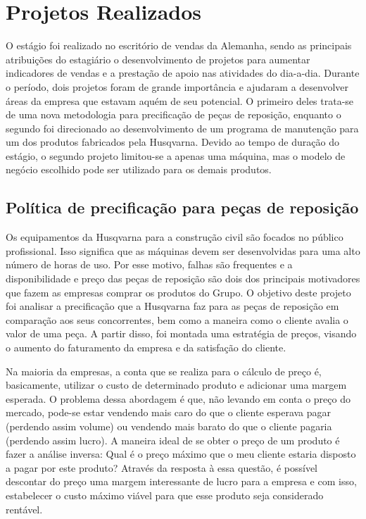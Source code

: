 \documentclass[12pt]{article}
\begin{document}
\section{Projetos Realizados}

	O estágio foi realizado no escritório de vendas da Alemanha, sendo as principais atribuições do estagiário o desenvolvimento de projetos para aumentar indicadores de vendas e a prestação de apoio nas atividades do dia-a-dia. Durante o período, dois projetos foram de grande importância e ajudaram a desenvolver áreas da empresa que estavam aquém de seu potencial. O primeiro deles trata-se de uma nova metodologia para precificação de peças de reposição, enquanto o segundo foi direcionado ao desenvolvimento de um programa de manutenção para um dos produtos fabricados pela Husqvarna. Devido ao tempo de duração do estágio, o segundo projeto limitou-se a apenas uma máquina, mas o modelo de negócio escolhido pode ser utilizado para os demais produtos.

\subsection{Política de precificação para peças de reposição}

	Os equipamentos da Husqvarna para a construção civil são focados no público profissional. Isso significa que as máquinas devem ser desenvolvidas para uma alto número de horas de uso. Por esse motivo, falhas são frequentes e a disponibilidade e preço das peças de reposição são dois dos principais motivadores que fazem as empresas comprar os produtos do Grupo. O objetivo deste projeto foi analisar a precificação que a Husqvarna faz para as peças de reposição em comparação aos seus concorrentes, bem como a maneira como o cliente avalia o valor de uma peça. A partir disso, foi montada uma estratégia de preços, visando o aumento do faturamento da empresa e da satisfação do cliente.

	Na maioria da empresas, a conta que se realiza para o cálculo de preço é, basicamente, utilizar o custo de determinado produto e adicionar uma margem esperada. O problema dessa abordagem é que, não levando em conta o preço do mercado, pode-se estar vendendo mais caro do que o cliente esperava pagar (perdendo assim volume) ou vendendo mais barato do que o cliente pagaria (perdendo assim lucro). A maneira ideal de se obter o preço de um produto é fazer a análise inversa: Qual é o preço máximo que o meu cliente estaria disposto a pagar por este produto? Através da resposta à essa questão, é possível descontar do preço uma margem interessante de lucro para a empresa e com isso, estabelecer o custo máximo viável para que esse produto seja considerado rentável.
\end{document}
